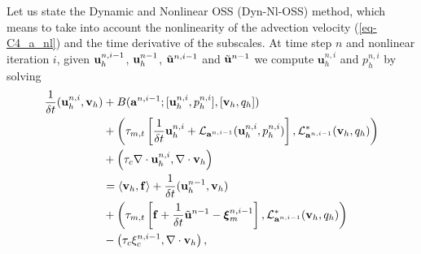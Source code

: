 Let us state the Dynamic and Nonlinear OSS (Dyn-Nl-OSS) method, which means to take into account the nonlinearity of the advection velocity (\ref{eq-C4_a_nl}) and the time derivative of the subscales. At time step $n$ and nonlinear iteration $i$, given ${\bf u}_h^{n,i-1}$, ${\bf u}_h^{n-1}$, $\tilde{{\bf u}}^{n,i-1}$ and $\tilde{{\bf u}}^{n-1}$ we compute $\mathbf{u}_h^{n,i}$ and $ p_h^{n,i} $ by solving
\begin{align}
\label{eq-C4_Dyn-Nl-OSS}
\frac{1}{\delta t}({\bf u}_h^{n,i},{\bf v}_h)
&+ B({\bf a}^{n,i-1};[{\bf u}_h^{n,i},p_h^{n,i}],[{\bf v}_h,q_h]) \\ \nonumber
&+\left(\tau_{m,t} \left[\frac{1}{\delta t}{\bf u}_h^{n,i}+ \mathcal{L}_{{\bf a}^{n,i-1}}({\bf u}_h^{n,i},p_h^{n,i})\right], \mathcal{L}^*_{{\bf a}^{n,i-1}}({\bf v}_h,q_h) \right)\\ \nonumber
 &+\left(\tau_c\nabla\cdot{\bf u}_h^{n,i},\nabla\cdot{\bf v}_h\right) \\\nonumber
 &=\langle{\bf v}_h,\mathbf{f}\rangle
 +\frac{1}{\delta t}({\bf u}_h^{n-1},{\bf v}_h) \\\nonumber
 &+\left(\tau_{m,t}\left[\mathbf{f}+\frac{1}{\delta t}\tilde{{\bf u}}^{n-1}-\boldsymbol{\xi}_m^{n,i-1}\right],\mathcal{L}^*_{{\bf a}^{n,i-1}}({\bf v}_h,q_h) \right) \\\nonumber
 &-\left(\tau_c\xi_c^{n,i-1},\nabla\cdot{\bf v}_h\right),
\end{align}
